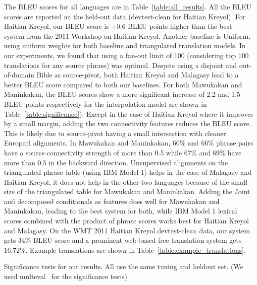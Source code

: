 \documentclass[11pt]{article}
\begin{document}
	The BLEU scores for all languages are in Table~\ref{table:all_results}. All the BLEU scores are reported on the held-out data (devtest-clean for Haitian Kreyol). For Haitian Kreyol, our BLEU score is +0.6 BLEU points higher than the best system from the 2011 Workshop on Haitian Kreyol. Another baseline is Uniform, using uniform weights for both baseline and triangulated translation models.  
	In our experiments, we found that using a fan-out limit of 100 (considering top 100 translations for any source phrase) was optimal. 
	Despite using a disjoint and out-of-domain Bible as source-pivot, both Haitian Kreyol and Malagasy lead to a better BLEU score compared to both our baselines. 
	For both Mawukakan and Maninkakan, the BLEU scores show a more significant increase of 2.2 and 1.5 BLEU points respectively for the interpolation model are shown in Table~\ref{table:significance}). 
	Except in the case of Haitian Kreyol where it improves by a small margin, adding the two connectivity features reduces the BLEU score. This is likely due to source-pivot having a small intersection with cleaner Europarl alignments. In Mawukakan and Maninkakan, 60\% and 66\% phrase pairs have a source connectivity strength of more than 0.5 while 67\% and 69\% have more than 0.5 in the backward direction.
Unsupervised alignments on the triangulated phrase table (using IBM Model 1) helps in the case of Malagasy and Haitian Kreyol, it does not help in the other two languages because of the small size of the triangulated table for Mawukakan and Maninkakan. Adding the Joint and decomposed conditionals as features does well for Mawukakan and Maninkakan, leading to the best system for both, while IBM Model 1 lexical scores combined with the product of phrase scores works best for Haitian Kreyol and Malagasy. On the WMT 2011 Haitian Kreyol devtest-clean data, our system gets 34\% BLEU score and a prominent web-based free translation system gets 16.72\%. Example translations are shown in Table~\ref{table:example_translations}. 
		\begin{table}
		\centering
			{
			
			}
			\caption{Significance tests for our results. All use the same tuning and heldout set. (We used multeval~\cite{Clark:11} for the significance tests)}
			\label{table:significance}
		\end{table}
\end{document}
